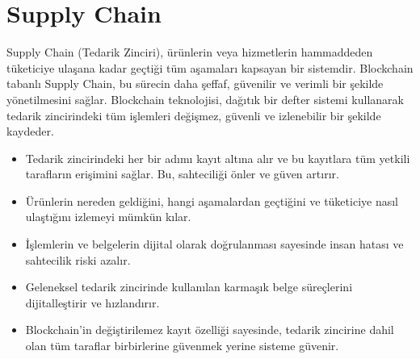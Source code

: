 \section{Supply Chain}

Supply Chain (Tedarik Zinciri), ürünlerin veya hizmetlerin hammaddeden tüketiciye ulaşana kadar geçtiği tüm aşamaları kapsayan bir sistemdir. Blockchain tabanlı Supply Chain, bu sürecin daha şeffaf, güvenilir ve verimli bir şekilde yönetilmesini sağlar. Blockchain teknolojisi, dağıtık bir defter sistemi kullanarak tedarik zincirindeki tüm işlemleri değişmez, güvenli ve izlenebilir bir şekilde kaydeder.

\begin{itemize}
    \item Tedarik zincirindeki her bir adımı kayıt altına alır ve bu kayıtlara tüm yetkili tarafların erişimini sağlar. Bu, sahteciliği önler ve güven artırır.
    \item Ürünlerin nereden geldiğini, hangi aşamalardan geçtiğini ve tüketiciye nasıl ulaştığını izlemeyi mümkün kılar.
    \item İşlemlerin ve belgelerin dijital olarak doğrulanması sayesinde insan hatası ve sahtecilik riski azalır.
    \item Geleneksel tedarik zincirinde kullanılan karmaşık belge süreçlerini dijitalleştirir ve hızlandırır.
    \item Blockchain’in değiştirilemez kayıt özelliği sayesinde, tedarik zincirine dahil olan tüm taraflar birbirlerine güvenmek yerine sisteme güvenir.
\end{itemize}

\newpage